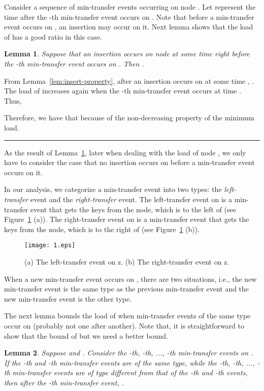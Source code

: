 \documentclass[a4paper]{article}
\newtheorem{lemma}{Lemma}
\newenvironment{proof}{{\bf Proof:}}{\hfill\rule{1.5mm}{3mm}\vspace{0.1in}}
\begin{document}
Consider a sequence of min-transfer events occurring on node .
Let  represent the time after the -th min-transfer event occurs
on . Note that before a min-transfer event occurs on , an insertion may
occur on it.  Next lemma shows that the load of  has a good ratio
in this case.

\begin{lemma}
  \label{lem:insert-between-min-transfer}
Suppose that an insertion occurs on node   at some time 
right before the -th min-transfer event occurs on . Then
.
\end{lemma}

\begin{proof}
  From Lemma~\ref{lem:insert-property}, after an insertion occurs
  on  at some time , . The load of 
  increases again when the -th min-transfer event occurs  at
  time .  Thus,
  
  Therefore, we have that  because of the non-decreasing property of the minimum load.
\end{proof}

As the result of Lemma~\ref{lem:insert-between-min-transfer}, later
when dealing with the load of node , we only have to consider the case
that no insertion occurs on  before a min-transfer event occurs
on it.

In our analysis, we categorize a min-transfer event into two types:
the {\em left-transfer} event and the {\em right-transfer} event. The
left-transfer event on  is a min-transfer event that  gets the
keys from the node, which is to the left of  (see
Figure~\ref{fig:1} (a)). The right-transfer event on  is
a min-transfer event that  gets the keys from the node, which is
to the right of  (see Figure~\ref{fig:1} (b)).

\begin{figure}
  \centering \texttt{[image: 1.eps]}
  \caption{(a) The left-transfer event on z. (b) The right-transfer
    event on z.}
  \label{fig:1}
\end{figure}

When a new min-transfer event occurs on , there are two
situations, i.e., the new min-transfer event is the same type as the
previous min-transfer event and the new min-transfer event is the
other type.

The next lemma bounds the load of  when  min-transfer events of
the same type occur on  (probably not one after another).  Note
that, it is straightforward to show that the bound of 
but we need a better bound.


\begin{lemma}
  \label{lem:genneralizemintransfer}
  Suppose  and . Consider the -th, -th, ..., -th min-transfer
  events on . If the -th and  -th
  min-transfer events are of the same type, while the -th,
  -th, ..., -th min-transfer events are of type
  different from that of the -th and  -th events, then
  after the -th min-transfer event, .
\end{lemma}
\end{document}
